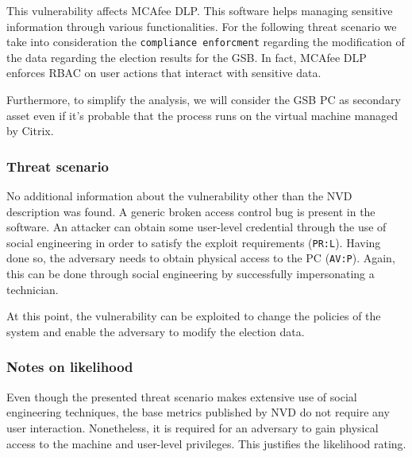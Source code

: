 This vulnerability affects MCAfee DLP. This software helps managing sensitive information through various functionalities\cite{online:mcafee}. For the following threat scenario we take into consideration the \texttt{compliance enforcment} regarding the modification of the data regarding the election results for the GSB. In fact, MCAfee DLP enforces RBAC on user actions that interact with sensitive data. 

Furthermore, to simplify the analysis, we will consider the GSB PC as secondary asset even if it's probable that the process runs on the virtual machine managed by Citrix.

\subsubsection*{Threat scenario}

No additional information about the vulnerability other than the NVD description was found. A generic broken access control bug is present in the software. An attacker can obtain some user-level credential through the use of social engineering in order to satisfy the exploit requirements (\texttt{PR:L}). Having done so, the adversary needs to obtain physical access to the PC (\texttt{AV:P}). Again, this can be done through social engineering by successfully impersonating a technician.

At this point, the vulnerability can be exploited to change the policies of the system and enable the adversary to modify the election data.

\subsubsection*{Notes on likelihood}

Even though the presented threat scenario makes extensive use of social engineering techniques, the base metrics published by NVD do not require any user interaction. Nonetheless, it is required for an adversary to gain physical access to the machine and user-level privileges. This justifies the likelihood rating.

